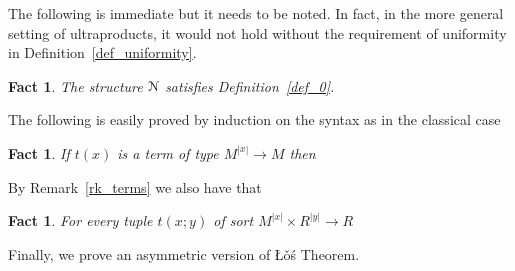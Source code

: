 \documentclass[11pt,oneside]{amsart}
\theoremstyle{plain}
\newtheorem{fact}[theorem]{Fact}
\theoremstyle{remark}
\begin{document}
The following is immediate but it needs to be noted.
In fact, in the more general setting of ultraproducts, it would not hold without the requirement of uniformity in Definition~\ref{def_uniformity}.

\begin{fact}\label{fact_termini1}
  The structure ${\EuScript N}$ satisfies Definition~\ref{def_0}.
\end{fact}

The following is easily proved by induction on the syntax as in the classical case

\begin{fact}\label{fact_easy_induz}
  If  $t(x)$ is a term of type $M^{|x|}\to M$ then
  
  \hfill\qedsymbol
\end{fact}

By Remark~\ref{rk_terms} we also have that

\begin{fact}\label{fact_termini2}
  For every tuple $t(x;y)$ of sort $M^{|x|}\times R^{|y|}\to R$
  
  \hfill\qedsymbol
\end{fact}

Finally, we prove an asymmetric version of \L\v{o}\'s Theorem.
\end{document}
